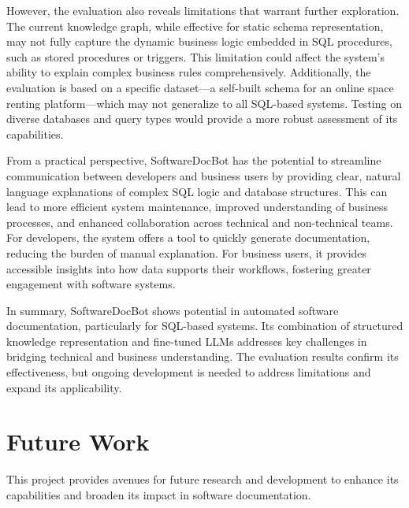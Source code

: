 \documentclass[11pt]{article}
\begin{document}
However, the evaluation also reveals limitations that warrant further exploration. The current knowledge graph, while effective for static schema representation, may not fully capture the dynamic business logic embedded in SQL procedures, such as stored procedures or triggers. This limitation could affect the system’s ability to explain complex business rules comprehensively. Additionally, the evaluation is based on a specific dataset—a self-built schema for an online space renting platform—which may not generalize to all SQL-based systems. Testing on diverse databases and query types would provide a more robust assessment of its capabilities.

From a practical perspective, SoftwareDocBot has the potential to streamline communication between developers and business users by providing clear, natural language explanations of complex SQL logic and database structures. This can lead to more efficient system maintenance, improved understanding of business processes, and enhanced collaboration across technical and non-technical teams. For developers, the system offers a tool to quickly generate documentation, reducing the burden of manual explanation. For business users, it provides accessible insights into how data supports their workflows, fostering greater engagement with software systems.

In summary, SoftwareDocBot shows potential in automated software documentation, particularly for SQL-based systems. Its combination of structured knowledge representation and fine-tuned LLMs addresses key challenges in bridging technical and business understanding. The evaluation results confirm its effectiveness, but ongoing development is needed to address limitations and expand its applicability.

\section{Future Work}

This project provides avenues for future research and development to enhance its capabilities and broaden its impact in software documentation.
\end{document}
